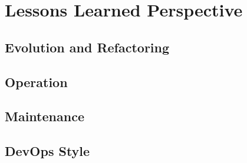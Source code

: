 \chapter{Lessons Learned Perspective}

\section{Evolution and Refactoring}

\section{Operation}

\section{Maintenance}


\section{DevOps Style}